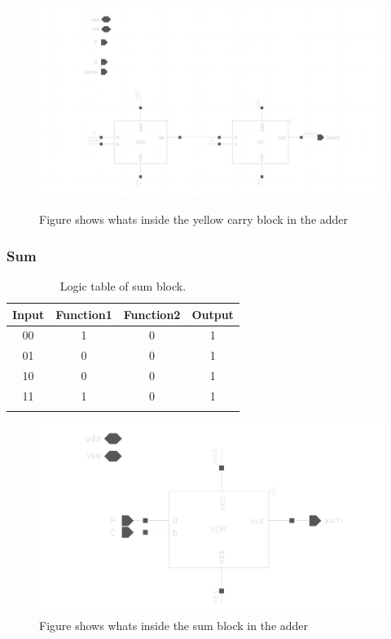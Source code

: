 \begin{figure}[H]
  \centering
  \captionsetup{justification=centering}
  {\includegraphics[width=1.0\textwidth]{../figures/yellow_carry}}
  \caption{Figure shows whats inside the yellow carry block in the adder} \label{fig:yellow_c}
\end{figure}

\subsubsection{Sum}

\begin{table}[H]
  \caption{Logic table of sum block.}
  \centering
  \begin{tabular}{cccc}
    \toprule
    Input & Function1 & Function2 & Output \\
    \midrule
    00 & 1 & 0& 1\\
    01 & 0 & 0 & 1\\
    10 & 0 & 0 & 1\\
    11 & 1 & 0 & 1\\
    \bottomrule
    \label{tab:sum}
  \end{tabular}
\end{table}

\begin{figure}[H]
  \centering
  \captionsetup{justification=centering}
  \includegraphics[clip,width=1.0\textwidth]{../figures/sum}
  \caption{Figure shows whats inside the sum block in the adder} \label{fig:sum}
\end{figure}
